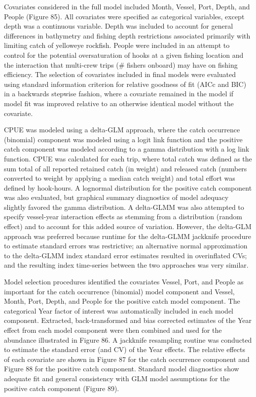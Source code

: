 \documentclass[11pt,
  english,
  letterpaper,
]{article}
\begin{document}
Covariates considered in the full model included Month, Vessel, Port, Depth, and People (Figure 85). All covariates were specified as categorical variables, except depth was a continuous variable. Depth was included to account for general differences in bathymetry and fishing depth restrictions associated primarily with limiting catch of yelloweye rockfish. People were included in an attempt to control for the potential oversaturation of hooks at a given fishing location and the interaction that multi-crew trips (\# fishers onboard) may have on fishing efficiency. The selection of covariates included in final models were evaluated using standard information criterion for relative goodness of fit (AICc and BIC) in a backwards stepwise fashion, where a covariate remained in the model if model fit was improved relative to an otherwise identical model without the covariate.

CPUE was modeled using a delta-GLM approach, where the catch occurrence (binomial) component was modeled using a logit link function and the positive catch component was modeled according to a gamma distribution with a log link function. CPUE was calculated for each trip, where total catch was defined as the sum total of all reported retained catch (in weight) and released catch (numbers converted to weight by applying a median catch weight) and total effort was defined by hook-hours. A lognormal distribution for the positive catch component was also evaluated, but graphical summary diagnostics of model adequacy slightly favored the gamma distribution. A delta-GLMM was also attempted to specify vessel-year interaction effects as stemming from a distribution (random effect) and to account for this added source of variation. However, the delta-GLM approach was preferred because runtime for the delta-GLMM jackknife procedure to estimate standard errors was restrictive; an alternative normal approximation to the delta-GLMM index standard error estimates resulted in overinflated CVs; and the resulting index time-series between the two approaches was very similar.

Model selection procedures identified the covariates Vessel, Port, and People as important for the catch occurrence (binomial) model component and Vessel, Month, Port, Depth, and People for the positive catch model component. The categorical Year factor of interest was automatically included in each model component. Extracted, back-transformed and bias corrected estimates of the Year effect from each model component were then combined and used for the abundance illustrated in Figure 86. A jackknife resampling routine was conducted to estimate the standard error (and CV) of the Year effects. The relative effects of each covariate are shown in Figure 87 for the catch occurrence component and Figure 88 for the positive catch component. Standard model diagnostics show adequate fit and general consistency with GLM model assumptions for the positive catch component (Figure 89).
\end{document}
